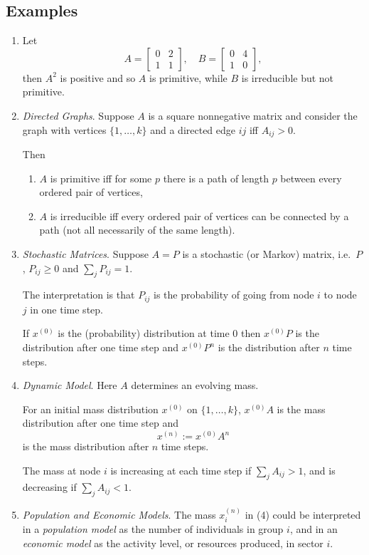 \documentclass[a4paper]{amsart}
\theoremstyle{plain}
\theoremstyle{definition}
\theoremstyle{remark}
\begin{document}
\subsection{Examples}\mbox{}
\begin{enumerate}
 
\item Let
\[
A=\begin{bmatrix}0&2\\1&1 \end{bmatrix}, \quad B=  \begin{bmatrix}0&4\\1&0 \end{bmatrix},
\]
then $ A^2 $ is positive and so $ A $ is primitive, while $ B $ is irreducible but not primitive.
  

\item \emph{Directed Graphs}.
Suppose $ A $ is a square nonnegative matrix and consider the graph with vertices $ \{1,\dots, k\} $  and a directed edge  $ ij $ iff $ A_{ij}>0 $.  

Then 
\begin{enumerate}

\item $ A $ is primitive iff for some $ p $ there is a path of length $ p $ between every ordered pair of vertices,
\item $ A $ is irreducible iff every ordered pair of vertices can be connected by a path (not all necessarily of the same length).
\end{enumerate} 

\item \emph{Stochastic Matrices}.  Suppose $ A=P $ is a stochastic (or Markov) matrix, i.e.\  $ P $, $ P_{ij}\geq 0 $ and $ \sum_j P_{ij} =1 $.   

The interpretation is that $ P_{ij} $ is the probability of going from node $ i $ to node $ j $ in one time step.  
 
 If $ x^{(0)} $ is the (probability) distribution at time $ 0 $ then $ x^{(0)}P $ is the distribution after one time step   and $ x^{(0)} P^n $ is the  distribution after $ n $  time steps.

\item \emph{Dynamic   Model}.  Here $ A $ determines an evolving mass.

For an  initial mass distribution $  x^{(0)} $ on $ \{1,\dots, k\} $, $ x^{(0)}A $ is the mass distribution after one time step   and 
\[
x^{(n)} :=  x^{(0)} A^n 
\]
 is the   mass distribution after $ n $  time steps.  

The mass   at  node $ i $  is increasing at each time step  if $ \sum_j A_{ij} > 1 $, and is decreasing if  $ \sum_j A_{ij} < 1 $.  

\item \emph{Population and Economic Models}. The mass $ x^{(n)}_i$ in (4) could be interpreted in a \emph{population model} as the number of individuals in group $ i $, and in an \emph{economic model} as the activity level, or resources produced, in sector $ i $.
\end{enumerate} 
 
\end{document}
